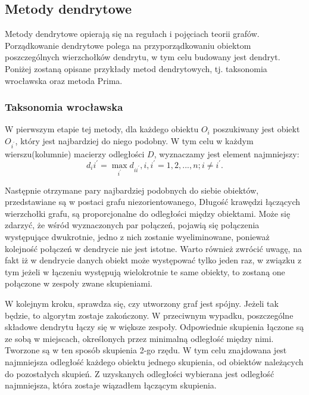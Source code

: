 \documentclass[12pt,a4paper]{report}
\begin{document}
\subsection{Metody dendrytowe}
\noindent 

Metody dendrytowe opierają się na regułach i pojęciach teorii grafów. Porządkowanie dendrytowe polega na przyporządkowaniu obiektom poszczególnych wierzchołków dendrytu, w tym celu budowany jest dendryt. Poniżej zostaną opisane przykłady metod dendrytowych, tj. taksonomia wrocławska oraz metoda Prima. 

\subsubsection{Taksonomia wrocławska}
\noindent

W pierwszym etapie tej metody, dla każdego obiektu $O_{i}$ poszukiwany jest obiekt $O_{i^{'}}$, który jest najbardziej do niego podobny. W tym celu w każdym wierszu(kolumnie) macierzy odległości $D$, wyznaczamy jest element najmniejszy: 
\begin{equation}
d_ii^{'}= \max\limits_{i^{'}} {d_{ii^{'}}}, i,i^{'}=1,2,...,n; i\neq i^{'}.
\end{equation}

Następnie otrzymane pary najbardziej podobnych do siebie obiektów, przedstawiane są w postaci grafu niezorientowanego, Długość krawędzi łączących wierzchołki grafu, są proporcjonalne do odległości między obiektami. Może się zdarzyć, że wśród wyznaczonych par połączeń, pojawią się połączenia występujące dwukrotnie, jedno z nich zostanie wyeliminowane, ponieważ kolejność połączeń w dendrycie nie jest istotne. Warto również zwrócić uwagę, na fakt iż w dendrycie danych obiekt może występować tylko jeden raz, w związku z tym jeżeli w łączeniu występują wielokrotnie te same obiekty, to zostaną one połączone w zespoły zwane skupieniami. 

W kolejnym kroku, sprawdza się, czy utworzony graf jest spójny. Jeżeli tak będzie, to algorytm zostaje zakończony. W przeciwnym wypadku, poszczególne składowe dendrytu łączy się w większe zespoły. Odpowiednie skupienia łączone są ze sobą w miejscach, określonych przez minimalną odległość między nimi. Tworzone są w ten sposób skupienia 2-go rzędu. W tym celu znajdowana jest najmniejsza odległość każdego obiektu jednego skupienia, od obiektów należących do pozostałych skupień. Z uzyskanych odległości wybierana jest odległość najmniejsza, która zostaje wiązadłem łączącym skupienia. 
\end{document}

